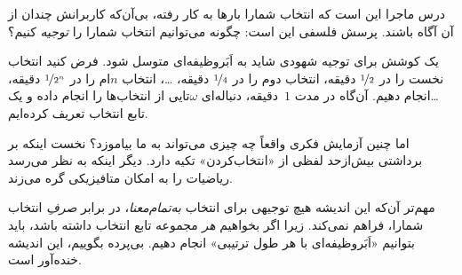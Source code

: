 \documentclass[../../../include/open-logic-section]{subfiles}
\begin{document}
درس ماجرا این است که انتخاب شمارا بارها به کار رفته، بی‌آن‌که
کاربرانش چندان از آن آگاه باشند. پرسش فلسفی این است: چگونه می‌توانیم
انتخاب شمارا را \emph{توجیه} کنیم؟

یک کوشش برای توجیه شهودی شاید به اَبَروظیفه‌ای متوسل شود. فرض کنید
انتخاب نخست را در $\nicefrac{1}{2}$ دقیقه، انتخاب دوم را در
$\nicefrac{1}{4}$ دقیقه، \dots، انتخاب $n$ام را در
$\nicefrac{1}{2^n}$ دقیقه، \dots انجام دهیم. آن‌گاه در مدت
$1$~دقیقه، دنباله‌ای $\omega$تایی از انتخاب‌ها را انجام داده و یک
تابع انتخاب تعریف کرده‌ایم.

اما چنین آزمایش فکری واقعاً چه چیزی می‌تواند به ما بیاموزد؟ نخست
اینکه بر برداشتی بیش‌ازحد لفظی از «انتخاب‌کردن» تکیه دارد. دیگر
اینکه به نظر می‌رسد ریاضیات را به امکان متافیزیکی گره می‌زند.

مهم‌تر آن‌که این اندیشه هیچ توجیهی برای انتخاب \emph{به‌تمام‌معنا}،
در برابر \emph{صرفِ} انتخاب شمارا، فراهم نمی‌کند. زیرا اگر بخواهیم
\emph{هر} مجموعه تابع انتخاب داشته باشد، باید بتوانیم
«اَبَروظیفه‌ای با هر طول ترتیبی» انجام دهیم. بی‌پرده بگوییم، این
اندیشه خنده‌آور است.
\end{document}
